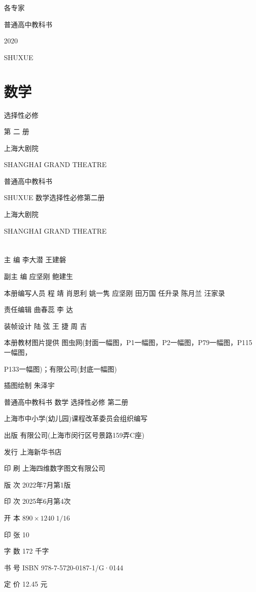 \documentclass[10pt]{article}
\begin{document}
各专家

普通高中教科书

2020

SHUXUE

\section*{数学}

选择性必修

第 二 册



上海大剧院

SHANGHAI GRAND THEATRE



普通高中教科书

SHUXUE 数学选择性必修第二册

上海大剧院

SHANGHAI GRAND THEATRE



\section*{}

主 编 李大潜 王建磐

副主 编 应坚刚 鲍建生

本册编写人员 程 靖 肖恩利 姚一隽 应坚刚 田万国 任升录 陈月兰 汪家录

责任编辑 曲春蕊 李 达

装帧设计 陆 弦 王 捷 周 吉

本册教材图片提供 图虫网(封面一幅图，P1一幅图，P2一幅图，P79一幅图，P115一幅图，

P133一幅图)；有限公司(封底一幅图)

插图绘制 朱泽宇

普通高中教科书 数学 选择性必修 第二册

上海市中小学(幼儿园)课程改革委员会组织编写

出版 有限公司(上海市闵行区号景路159弄C座)

发行 上海新华书店

印 刷 上海四维数字图文有限公司

版 次 2022年7月第1版

印 次 2025年6月第4次

开 本 \({890} \times  {1240}\;1/{16}\)

印 张 10

字 数 172 千字

书 号 ISBN 978-7-5720-0187-1/G·0144

定 价 12.45 元
\end{document}

